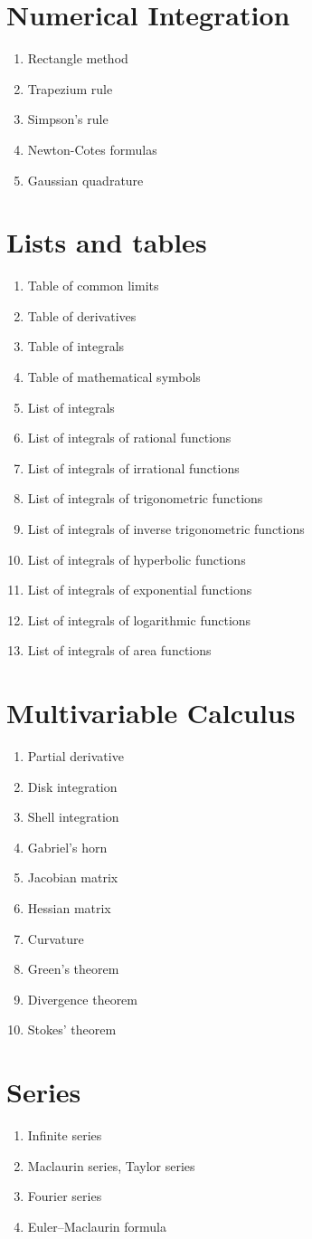 \section{Numerical Integration}
\begin{enumerate}
\item Rectangle method
\item Trapezium rule
\item Simpson's rule
\item Newton-Cotes formulas
\item Gaussian quadrature
\end{enumerate}

\section{Lists and tables}
\begin{enumerate}
\item Table of common limits
\item Table of derivatives
\item Table of integrals
\item Table of mathematical symbols
\item List of integrals
\item List of integrals of rational functions
\item List of integrals of irrational functions
\item List of integrals of trigonometric functions
\item List of integrals of inverse trigonometric functions
\item List of integrals of hyperbolic functions
\item List of integrals of exponential functions
\item List of integrals of logarithmic functions
\item List of integrals of area functions
\end{enumerate}

\section{Multivariable Calculus}
\begin{enumerate}
\item Partial derivative
\item Disk integration
\item Shell integration
\item Gabriel's horn
\item Jacobian matrix
\item Hessian matrix
\item Curvature
\item Green's theorem
\item Divergence theorem
\item Stokes' theorem
\end{enumerate}

\section{Series}
\begin{enumerate}
\item Infinite series
\item Maclaurin series, Taylor series
\item Fourier series
\item Euler–Maclaurin formula
\end{enumerate}


